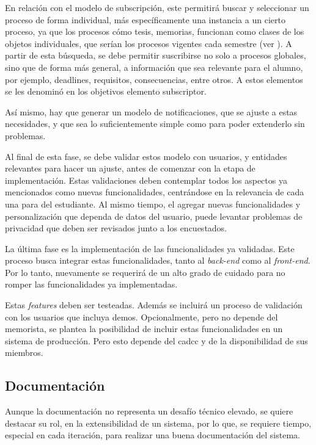     \par En relación con el modelo de subscripción, este permitirá buscar y seleccionar un proceso de forma individual, más específicamente una instancia a un cierto proceso, ya que los procesos cómo tesis, memorias, funcionan como clases de los objetos individuales, que serían los procesos vigentes cada semestre (ver \cite{ARANCIBIA2021}).  A partir de esta búsqueda, se debe permitir suscribirse no solo a procesos globales, sino que de forma más general, a información que sea relevante para el alumno, por ejemplo, deadlines, requisitos, consecuencias, entre otros. A estos elementos se les denominó en los objetivos elemento subscriptor.
    
    \par Así mismo, hay que generar un modelo de notificaciones, que se ajuste a estas necesidades, y que sea lo suficientemente simple como para poder extenderlo sin problemas.
   
    \par Al final de esta fase, se debe validar estos modelo con usuarios, y entidades relevantes para hacer un ajuste, antes de comenzar con la etapa de implementación. Estas validaciones deben contemplar todos los aspectos ya mencionados como nuevas funcionalidades, centrándose en la relevancia de cada una para del estudiante. Al mismo tiempo, el agregar nuevas funcionalidades y personalización que dependa de datos del usuario, puede levantar problemas de privacidad que deben ser revisados junto a los encuestados.

    \par La última fase es la implementación de las funcionalidades ya validadas. Este proceso busca integrar estas funcionalidades, tanto al \textit{back-end} como al \textit{front-end}. Por lo tanto, nuevamente se requerirá de un alto grado de cuidado para no romper las funcionalidades ya implementadas.
    \par Estas \textit{features} deben ser testeadas. Además se incluirá un proceso de validación con los usuarios que incluya demos. Opcionalmente, pero no depende del memorista, se plantea la posibilidad de incluir estas funcionalidades en un sistema de producción. Pero esto depende del \acrshort{cadcc} y de la disponibilidad de sus miembros.
    \subsection{Documentación}
    \par Aunque la documentación no representa un desafío técnico elevado, se quiere destacar su rol, en la extensibilidad de un sistema, por lo que, se requiere tiempo, especial en cada iteración, para realizar una buena documentación del sistema.
    
